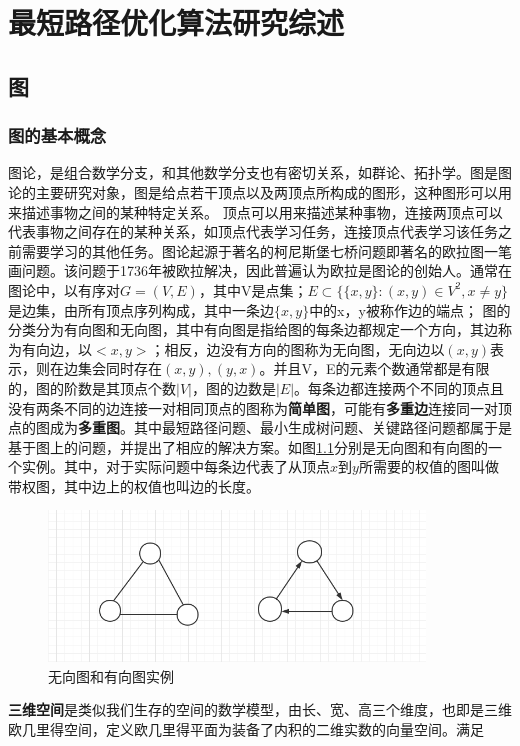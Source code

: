 \chapter{最短路径优化算法研究综述}

\section{图}

\subsection{图的基本概念}
图论，是组合数学分支，和其他数学分支也有密切关系，如群论、拓扑学。图是图论的主要研究对象，图是给点若干顶点以及两顶点所构成的图形，这种图形可以用来描述事物之间的某种特定关系。
顶点可以用来描述某种事物，连接两顶点可以代表事物之间存在的某种关系，如顶点代表学习任务，连接顶点代表学习该任务之前需要学习的其他任务。图论起源于著名的柯尼斯堡七桥问题即著名的欧拉图一笔画问题。该问题于1736年被欧拉解决，因此普遍认为欧拉是图论的创始人\cite{r1}。通常在图论中，以有序对$G=(V,E)$，其中V是点集；$E\subset \{\{x, y\}:(x,y)\in V^2,x\ne y\}$是边集，由所有顶点序列构成，其中一条边$\{x,y\}$中的x，y被称作边的端点；
图的分类分为有向图和无向图，其中有向图是指给图的每条边都规定一个方向，其边称为有向边，以$<x,y>$；相反，边没有方向的图称为无向图，无向边以$(x,y)$表示，则在边集会同时存在$(x,y),(y,x)$。并且V，E的元素个数通常都是有限的，图的阶数是其顶点个数$|V|$，图的边数是$|E|$。每条边都连接两个不同的顶点且没有两条不同的边连接一对相同顶点的图称为\textbf{简单图}，可能有\textbf{多重边}连接同一对顶点的图成为\textbf{多重图}。其中最短路径问题、最小生成树问题、关键路径问题都属于是基于图上的问题，并提出了相应的解决方案。如图\ref{fig:graph_ex}分别是无向图和有向图的一个实例。其中，对于实际问题中每条边代表了从顶点$x$到$y$所需要的权值的图叫做带权图，其中边上的权值也叫边的长度。
\begin{figure}[htbp]
  \centering
  \includegraphics[width=10cm]{figures/graph_ex.png}
  \caption{无向图和有向图实例}  
  \label{fig:graph_ex}
\end{figure}
\par\textbf{三维空间}是类似我们生存的空间的数学模型，由长、宽、高三个维度，也即是三维欧几里得空间，定义欧几里得平面为装备了内积的二维实数的向量空间。满足
